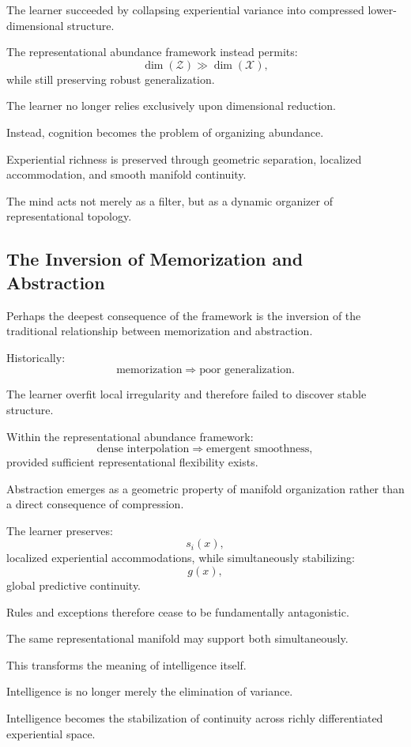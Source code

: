 \documentclass[12pt,a4paper]{article}
\begin{document}
The learner succeeded by collapsing experiential variance into compressed lower-dimensional structure.

The representational abundance framework instead permits:
\[
\dim(\mathcal{Z})
\gg
\dim(\mathcal{X}),
\]
while still preserving robust generalization.

The learner no longer relies exclusively upon dimensional reduction.

Instead, cognition becomes the problem of organizing abundance.

Experiential richness is preserved through geometric separation, localized accommodation, and smooth manifold continuity.

The mind acts not merely as a filter, but as a dynamic organizer of representational topology.

\subsection{The Inversion of Memorization and Abstraction}

Perhaps the deepest consequence of the framework is the inversion of the traditional relationship between memorization and abstraction.

Historically:
\[
\text{memorization}
\Rightarrow
\text{poor generalization}.
\]

The learner overfit local irregularity and therefore failed to discover stable structure.

Within the representational abundance framework:
\[
\text{dense interpolation}
\Rightarrow
\text{emergent smoothness},
\]
provided sufficient representational flexibility exists.

Abstraction emerges as a geometric property of manifold organization rather than a direct consequence of compression.

The learner preserves:
\[
s_i(x),
\]
localized experiential accommodations,
while simultaneously stabilizing:
\[
g(x),
\]
global predictive continuity.

Rules and exceptions therefore cease to be fundamentally antagonistic.

The same representational manifold may support both simultaneously.

This transforms the meaning of intelligence itself.

Intelligence is no longer merely the elimination of variance.

Intelligence becomes the stabilization of continuity across richly differentiated experiential space.
\end{document}
